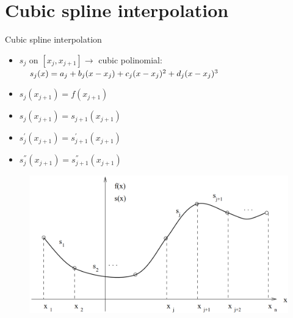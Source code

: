 \section{Cubic spline interpolation}
	\begin{frame}{Cubic spline interpolation}
		\begin{block}{}
			\begin{itemize}
				\item $s_{j}$ on $[x_{j},x_{j+1}] \rightarrow$ cubic polinomial:
                $\newline \ \ \ s_{j}(x)=a_{j}+b_{j}(x-x_{j})+c_{j}(x-x_{j})^{2}+
                d_{j}(x-x_{j})^{3}$
                \item $s_{j}(x_{j+1})=f(x_{j+1})$
                \item $s_{j}(x_{j+1})=s_{j+1}(x_{j+1})$
                \item $s^{'}_{j}(x_{j+1})=s^{'}_{j+1}(x_{j+1})$
                \item $s^{''}_{j}(x_{j+1})=s^{''}_{j+1}(x_{j+1})$
			\end{itemize}
		\end{block}
        \begin{figure}[h]
			\includegraphics[width=.55\linewidth]{img/4/spline_img_4}
		\end{figure}
	\end{frame}